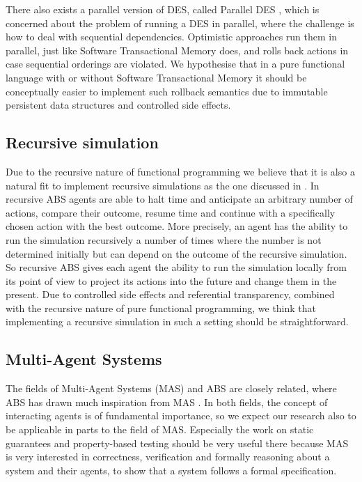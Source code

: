 There also exists a parallel version of DES, called Parallel DES \cite{fujimoto_parallel_2017}, which is concerned about the problem of running a DES in parallel, where the challenge is how to deal with sequential dependencies. Optimistic approaches run them in parallel, just like Software Transactional Memory does, and rolls back actions in case sequential orderings are violated. We hypothesise that in a pure functional language with or without Software Transactional Memory it should be conceptually easier to implement such rollback semantics due to immutable persistent data structures and controlled side effects.
 
\subsection{Recursive simulation}
Due to the recursive nature of functional programming we believe that it is also a natural fit to implement recursive simulations as the one discussed in \cite{gilmer_recursive_2000}. In recursive ABS agents are able to halt time and anticipate an arbitrary number of actions, compare their outcome, resume time and continue with a specifically chosen action with the best outcome. More precisely, an agent has the ability to run the simulation recursively a number of times where the number is not determined initially but can depend on the outcome of the recursive simulation. So recursive ABS gives each agent the ability to run the simulation locally from its point of view to project its actions into the future and change them in the present. Due to controlled side effects and referential transparency, combined with the recursive nature of pure functional programming, we think that implementing a recursive simulation in such a setting should be straightforward.

\subsection{Multi-Agent Systems}
The fields of Multi-Agent Systems (MAS) and ABS are closely related, where ABS has drawn much inspiration from MAS \cite{weiss_multiagent_2013,wooldridge_introduction_2009}. In both fields, the concept of interacting agents is of fundamental importance, so we expect our research also to be applicable in parts to the field of MAS. Especially the work on static guarantees and property-based testing should be very useful there because MAS is very interested in correctness, verification and formally reasoning about a system and their agents, to show that a system follows a formal specification.